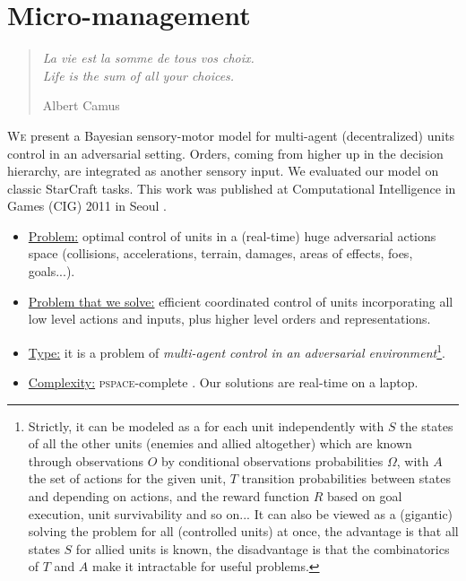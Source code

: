 \chapter{Micro-management}
\label{chapter:micro}
\begin{quotation}
\noindent
\textit{La vie est la somme de tous vos choix.
\vspace{0.2cm}\\
Life is the sum of all your choices.}
\begin{flushright}Albert Camus\end{flushright}
\end{quotation}

\lettrine{W}{e} present a Bayesian sensory-motor model for multi-agent (decentralized) units control in an adversarial setting. Orders, coming from higher up in the decision hierarchy, are integrated as another sensory input. We evaluated our model on classic StarCraft  tasks. This work was published at Computational Intelligence in Games (CIG) 2011 in Seoul \citep{SYNNAEVE:Micro}.


\begin{itemize}
\item \underline{Problem:} optimal control of units in a (real-time) huge adversarial actions space (collisions, accelerations, terrain, damages, areas of effects, foes, goals...).
\item \underline{Problem that we solve:} efficient coordinated control of units incorporating all low level actions and inputs, plus higher level orders and representations.
\item \underline{Type:} it is a problem of \textit{multi-agent control in an adversarial environment}\footnote{Strictly, it can be modeled as a  for each unit independently with $S$ the states of all the other units (enemies and allied altogether) which are known through observations $O$ by conditional observations probabilities $\Omega$, with $A$ the set of actions for the given unit, $T$ transition probabilities between states and depending on actions, and the reward function $R$ based on goal execution, unit survivability and so on... It can also be viewed as a (gigantic)  solving the problem for all (controlled units) at once, the advantage is that all states $S$ for allied units is known, the disadvantage is that the combinatorics of $T$ and $A$ make it intractable for useful problems.}.
\item \underline{Complexity:} \textsc{pspace}-complete \citep{Papadimitriou87,GamingComplexity}. Our solutions are real-time on a laptop.
\end{itemize}

